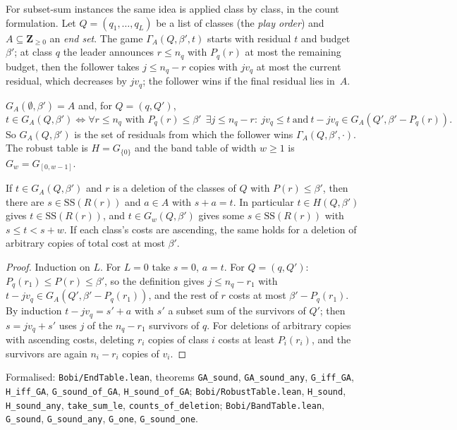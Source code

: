 For subset-sum instances the same idea is applied class by class, in the
count formulation. Let $Q=(q_1,\dots,q_L)$ be a list of classes (the
\emph{play order}) and $A\subseteq\mathbf{Z}_{\ge 0}$ an \emph{end set}. The game
$\Gamma_A(Q,\beta',t)$ starts with residual $t$ and budget $\beta'$; at class $q$
the leader announces $r\le n_q$ with $P_q(r)$ at most the remaining budget,
then the follower takes $j\le n_q-r$ copies with $jv_q$ at most the current
residual, which decreases by $jv_q$; the follower wins if the final residual
lies in~$A$.

\begin{definition}\label{def:tables}
$G_A(\emptyset,\beta')=A$ and, for $Q=(q,Q')$,
\[
  t\in G_A(Q,\beta')\iff \forall r\le n_q \text{ with } P_q(r)\le\beta'\ \
  \exists j\le n_q-r:\ jv_q\le t\ \text{and}\ t-jv_q\in G_A(Q',\beta'-P_q(r)).
\]
So $G_A(Q,\beta')$ is the set of residuals from which the follower wins
$\Gamma_A(Q,\beta',\cdot)$. The robust table is $H=G_{\{0\}}$ and the band table of
width $w\ge 1$ is $G_w=G_{[0,w-1]}$.
\end{definition}

\begin{theorem}\label{thm:tables-sound}
If $t\in G_A(Q,\beta')$ and $r$ is a deletion of the classes of $Q$ with
$P(r)\le\beta'$, then there are $s\in\mathrm{SS}(R(r))$ and $a\in A$ with $s+a=t$. In
particular $t\in H(Q,\beta')$ gives $t\in\mathrm{SS}(R(r))$, and $t\in G_w(Q,\beta')$ gives
some $s\in\mathrm{SS}(R(r))$ with $s\le t<s+w$. If each class's costs are ascending,
the same holds for a deletion of arbitrary copies of total cost at most
$\beta'$.
\end{theorem}
\begin{proof}
Induction on $L$. For $L=0$ take $s=0$, $a=t$. For $Q=(q,Q')$:
$P_q(r_1)\le P(r)\le\beta'$, so the definition gives $j\le n_q-r_1$ with
$t-jv_q\in G_A(Q',\beta'-P_q(r_1))$, and the rest of $r$ costs at most
$\beta'-P_q(r_1)$. By induction $t-jv_q=s'+a$ with $s'$ a subset sum of the
survivors of $Q'$; then $s=jv_q+s'$ uses $j$ of the $n_q-r_1$ survivors of
$q$. For deletions of arbitrary copies with ascending costs, deleting $r_i$
copies of class $i$ costs at least $P_i(r_i)$, and the survivors are again
$n_i-r_i$ copies of $v_i$.
\end{proof}
{\raggedright\noindent Formalised: \texttt{Bobi/EndTable.lean}, theorems
\texttt{GA\_sound}, \texttt{GA\_sound\_any}, \texttt{G\_iff\_GA},
\texttt{H\_iff\_GA}, \texttt{G\_sound\_of\_GA}, \texttt{H\_sound\_of\_GA};
\texttt{Bobi/RobustTable.lean}, \texttt{H\_sound}, \texttt{H\_sound\_any},
\texttt{take\_sum\_le}, \texttt{counts\_of\_deletion};
\texttt{Bobi/BandTable.lean}, \texttt{G\_sound}, \texttt{G\_sound\_any},
\texttt{G\_one}, \texttt{G\_sound\_one}.\par}

